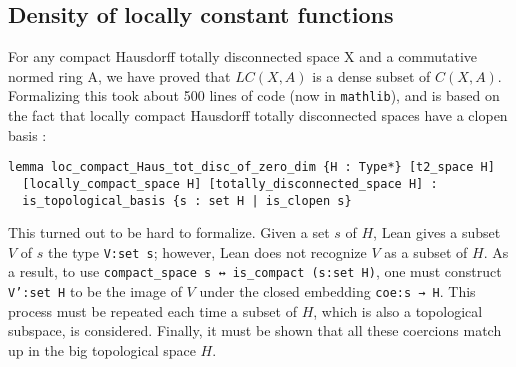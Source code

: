 \documentclass[a4paper,UKenglish,cleveref, autoref, thm-restate]{lipics-v2021}
\newcommand{\lean}[1]{\texttt{#1}\xspace} %
\begin{document}
\subsection{Density of locally constant functions}
For any compact Hausdorff totally disconnected space X and a commutative
normed ring A, we have proved that $LC(X, A)$ is a dense subset of $C(X, A)$. 
Formalizing this took about 500 lines of code (now in \lean{mathlib}), and is based on the fact that locally compact Hausdorff
totally disconnected spaces have a clopen basis :
\begin{lstlisting}
lemma loc_compact_Haus_tot_disc_of_zero_dim {H : Type*} [t2_space H] 
  [locally_compact_space H] [totally_disconnected_space H] : 
  is_topological_basis {s : set H | is_clopen s}
\end{lstlisting}
This turned out to be hard to formalize. Given a set $s$ of $H$, Lean gives a subset $V$ of $s$ 
the type \lean{V:set s}; however, Lean does not recognize $V$ as a subset of $H$. As a result, 
to use \lean{compact\_space s ↔ is\_compact (s:set H)}, one must construct \lean{V':set H} 
to be the image of $V$ under the closed embedding \lean{coe:s → H}. This process must be repeated each time a subset of $H$, 
which is also a topological subspace, is considered. Finally, it must be shown that all these coercions match up in the big 
topological space $H$.
\end{document}
